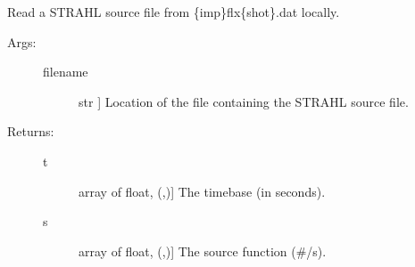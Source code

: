 \documentclass[letterpaper,10pt,english]{sphinxmanual}
\begin{document}

\begin{fulllineitems}
\label{\detokenize{aurora:aurora.source_utils.read_source}}
Read a STRAHL source file from \{imp\}flx\{shot\}.dat locally.
\begin{description}
\item[{Args:}] \leavevmode\begin{description}
\item[{filename}] \leavevmode{[}str {]}
Location of the file containing the STRAHL source file.

\end{description}

\item[{Returns:}] \leavevmode\begin{description}
\item[{t}] \leavevmode{[}array of float, (,){]}
The timebase (in seconds).

\item[{s}] \leavevmode{[}array of float, (,){]}
The source function (\#/s).

\end{description}

\end{description}

\end{fulllineitems}

\end{document}
